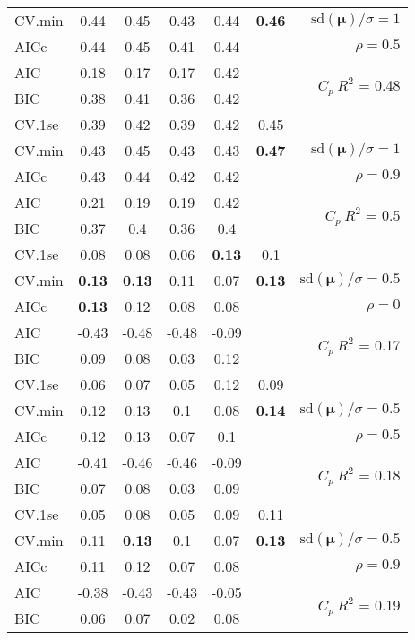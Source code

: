 \documentclass[12pt]{article}
\newcommand{\mr}[1]{\mathrm{#1}}
\newcommand{\bm}[1]{\mathbf{#1}}
\begin{document}
\begin{table}[p]
\begin{center}
\begin{tabular}{l*{5}{c}|r}
CV.min & 0.44 & 0.45 & 0.43 & 0.44 & {\bf 0.46} &  $\mr{sd}(\bm{\mu})/\sigma=1$ \\
AICc & 0.44 & 0.45 & 0.41 & 0.44 & & $\rho=0.5$ \\
AIC & 0.18 & 0.17 & 0.17 & 0.42 & & \multirow{2}{*}{$C_p ~ R^2$ = 0.48} \\
BIC & 0.38 & 0.41 & 0.36 & 0.42 & & \\
 \hline 
CV.1se & 0.39 & 0.42 & 0.39 & 0.42 & 0.45 &\\
CV.min & 0.43 & 0.45 & 0.43 & 0.43 & {\bf 0.47} &  $\mr{sd}(\bm{\mu})/\sigma=1$ \\
AICc & 0.43 & 0.44 & 0.42 & 0.42 & & $\rho=0.9$ \\
AIC & 0.21 & 0.19 & 0.19 & 0.42 & & \multirow{2}{*}{$C_p ~ R^2$ = 0.5} \\
BIC & 0.37 & 0.4 & 0.36 & 0.4 & & \\
 \hline 
CV.1se & 0.08 & 0.08 & 0.06 & {\bf 0.13} & 0.1 &\\
CV.min & {\bf 0.13} & {\bf 0.13} & 0.11 & 0.07 & {\bf 0.13} &  $\mr{sd}(\bm{\mu})/\sigma=0.5$ \\
AICc & {\bf 0.13} & 0.12 & 0.08 & 0.08 & & $\rho=0$ \\
AIC & -0.43 & -0.48 & -0.48 & -0.09 & & \multirow{2}{*}{$C_p ~ R^2$ = 0.17} \\
BIC & 0.09 & 0.08 & 0.03 & 0.12 & & \\
 \hline 
CV.1se & 0.06 & 0.07 & 0.05 & 0.12 & 0.09 &\\
CV.min & 0.12 & 0.13 & 0.1 & 0.08 & {\bf 0.14} &  $\mr{sd}(\bm{\mu})/\sigma=0.5$ \\
AICc & 0.12 & 0.13 & 0.07 & 0.1 & & $\rho=0.5$ \\
AIC & -0.41 & -0.46 & -0.46 & -0.09 & & \multirow{2}{*}{$C_p ~ R^2$ = 0.18} \\
BIC & 0.07 & 0.08 & 0.03 & 0.09 & & \\
 \hline 
CV.1se & 0.05 & 0.08 & 0.05 & 0.09 & 0.11 &\\
CV.min & 0.11 & {\bf 0.13} & 0.1 & 0.07 & {\bf 0.13} &  $\mr{sd}(\bm{\mu})/\sigma=0.5$ \\
AICc & 0.11 & 0.12 & 0.07 & 0.08 & & $\rho=0.9$ \\
AIC & -0.38 & -0.43 & -0.43 & -0.05 & & \multirow{2}{*}{$C_p ~ R^2$ = 0.19} \\
BIC & 0.06 & 0.07 & 0.02 & 0.08 & & \\
 \hline
\end{tabular}
\end{center}
\vspace{-1cm}
\end{table}
\end{document}
